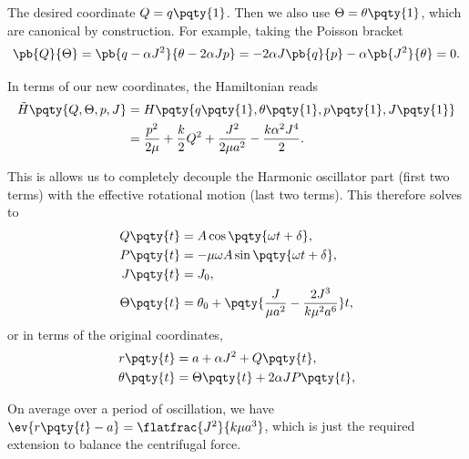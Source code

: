 \begin{example}
    The desired coordinate \(Q = q\pqty{1}\). Then we also use \(\Theta = \theta\pqty{1}\), which are canonical by construction. For example, taking the Poisson bracket
    \begin{equation}
        \pb{Q}{\Theta} = \pb{q - \alpha J^2}{\theta - 2 \alpha J p} = - 2 \alpha J \pb{q}{p} - \alpha \pb{J^2}{\theta} = 0.
    \end{equation}

    In terms of our new coordinates, the Hamiltonian reads
    \begin{subequations}
        \begin{align}
            \tilde{H} \pqty{Q, \Theta, p, J} &= H\pqty{q\pqty{1}, \theta\pqty{1}, p\pqty{1}, J\pqty{1}} \\
            &= \frac{p^2}{2 \mu} + \frac{k}{2} Q^2 + \frac{J^2}{2 \mu a^2} - \frac{k \alpha^2 J^4}{2}.
        \end{align}
    \end{subequations}

    This is allows us to completely decouple the Harmonic oscillator part (first two terms) with the effective rotational motion (last two terms). This therefore solves to
    \begin{subequations}
        \begin{align}
            Q\pqty{t} &= A \cos \pqty{\omega t + \delta}, \\
            P\pqty{t} &= - \mu \omega A \sin \pqty{\omega t + \delta}, \\
            J\pqty{t} &= J_0, \\
            \Theta\pqty{t} &= \theta_0 + \pqty{\frac{J}{\mu a^2} - \frac{2 J^3}{k \mu^2 a^6}} t,
        \end{align}
    \end{subequations}
    or in terms of the original coordinates,
    \begin{subequations}
        \begin{align}
            r\pqty{t} &= a + \alpha J^2 + Q\pqty{t}, \\
            \theta\pqty{t} &= \Theta\pqty{t} + 2 \alpha J P\pqty{t},
        \end{align}
    \end{subequations}

    On average over a period of oscillation, we have \(\ev{r\pqty{t} - a} = \flatfrac{J^2}{k \mu a^3}\), which is just the required extension to balance the centrifugal force.
\end{example}

